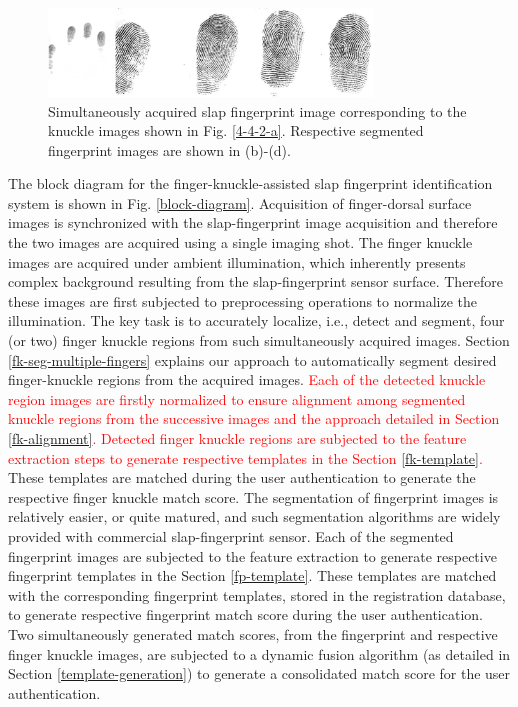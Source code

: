 \begin{figure}[!ht]
    \centering
    \includegraphics[width=3.4in]{Figures/4-4-2-fingerprint.png}
    \caption{Simultaneously acquired slap fingerprint image corresponding to the knuckle images shown in Fig. \ref{4-4-2-a}. Respective segmented fingerprint images are shown in (b)-(d).}
    \label{capture-finerprint}
\end{figure}

The block diagram for the finger-knuckle-assisted slap fingerprint identification system is shown in Fig. \ref{block-diagram}. Acquisition of finger-dorsal surface images is synchronized with the slap-fingerprint image acquisition and therefore the two images are acquired using a single imaging shot. The finger knuckle images are acquired under ambient illumination, which inherently presents complex background resulting from the slap-fingerprint sensor surface. Therefore these images are first subjected to preprocessing operations to normalize the illumination. The key task is to accurately localize, i.e., detect and segment, four (or two) finger knuckle regions from such simultaneously acquired images. Section \ref{fk-seg-multiple-fingers} explains our approach to automatically segment desired finger-knuckle regions from the acquired images. \textcolor{red}{ Each   of   the   detected   knuckle   region   images  are  firstly normalized to ensure alignment among segmented knuckle regions from the successive images and the approach detailed in Section \ref{fk-alignment}. Detected finger knuckle regions are subjected to the feature extraction steps to generate respective templates in the Section \ref{fk-template}.} These templates are matched during the user authentication to generate the respective finger knuckle match score. The segmentation of fingerprint images is relatively easier, or quite matured, and such segmentation algorithms are widely provided with commercial slap-fingerprint sensor. Each of the segmented fingerprint images are subjected to the feature extraction to generate respective fingerprint templates in the Section \ref{fp-template}. These templates are matched with the corresponding fingerprint templates, stored in the registration database, to generate respective fingerprint match score during the user authentication. Two simultaneously generated match scores, from the fingerprint and respective finger knuckle images, are subjected to a dynamic fusion algorithm (as detailed in Section \ref{template-generation}) to generate a consolidated match score for the user authentication.   


